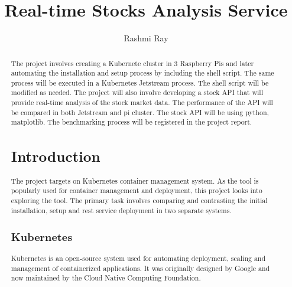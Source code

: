 
\title{Real-time Stocks Analysis Service}

\author{Rashmi Ray}

\renewcommand{\shortauthors}{Uma Kugan}
\begin{abstract}
\begin{abstract}
The project involves creating a Kubernete cluster in 3 Raspberry Pis and later 
automating the installation and setup process by including the shell script.
The same process will be executed in a Kubernetes Jetstream process. The shell
script will be modified as needed. The project will also involve developing a stock 
API that will provide real-time analysis of the stock market data. The performance
of the API will be compared in both Jetstream and pi cluster. The stock API will 
be using python, matplotlib. The benchmarking process will be registered in the project report.

\end{abstract}



\maketitle

\section{Introduction}
The project targets on Kubernetes container management system. As the tool is popularly used
for container management and deployment, this project looks into exploring the tool.
The primary task involves comparing and contrasting the initial installation, 
setup and rest service deployment in two separate systems.  



\subsection{Kubernetes}
Kubernetes is an open-source system used for automating deployment, 
scaling and management of containerized applications. It was originally 
designed by Google and now maintained by the Cloud Native Computing 
Foundation.\cite{hid-sp18-417-kubernetes}


\end{abstract}
